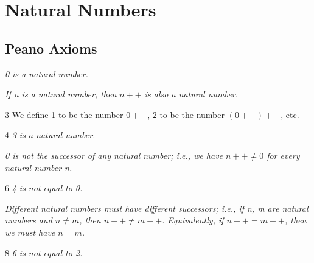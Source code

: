 \section{Natural Numbers}\label{a1-ch2}

\subsection{Peano Axioms}
\begin{axiom}
    \label{ax-zero-nat}
\emph{0 is a natural number.}
\end{axiom}

\begin{axiom}
    \label{ax-succ-nat}
\emph{If n is a natural number, then $n++$ is also a natural number.}
\end{axiom}

\begin{definition}{3}
    \label{nat-numerals}
We define 1 to be the number $0++$, 2 to be the number $(0++)++$, etc.
\end{definition}

\begin{proposition}{4}
    \label{three-is-nat}
\emph{3 is a natural number.}
\end{proposition}

\begin{axiom}
    \label{ax-succ-ne-zero}
\emph{0 is not the successor of any natural number; i.e., we have $n++ \neq 0$ for every natural number n.}
\end{axiom}

\begin{proposition}{6}
    \label{four-ne-zero}
\emph{4 is not equal to 0.}
\end{proposition}

\begin{axiom}
    \label{ax-succ-injective}
\emph{Different natural numbers must have different successors; i.e., if n, m are natural numbers and $n\neq m$, then $n++\neq m++$. Equivalently, if $n++ = m++$, then we must have $n=m$.}
\end{axiom}

\begin{proposition}{8}
    \label{six-ne-two}
\emph{6 is not equal to 2.}
\end{proposition}

